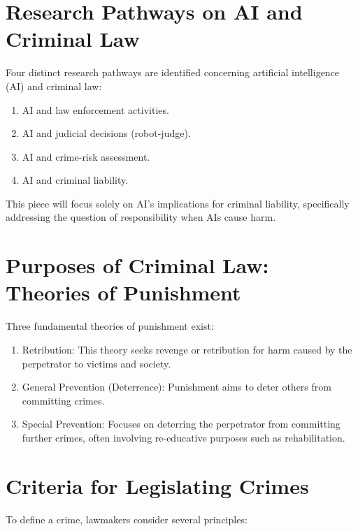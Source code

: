 \section{Research Pathways on AI and Criminal Law}

Four distinct research pathways are identified concerning artificial intelligence (AI) and criminal law:

\begin{enumerate}
    \item AI and law enforcement activities.
    \item AI and judicial decisions (robot-judge).
    \item AI and crime-risk assessment.
    \item AI and criminal liability.
\end{enumerate}

This piece will focus solely on AI's implications for criminal liability, specifically addressing the question of responsibility when AIs cause harm.

\section{Purposes of Criminal Law: Theories of Punishment}

Three fundamental theories of punishment exist:

\begin{enumerate}
    \item Retribution: This theory seeks revenge or retribution for harm caused by the perpetrator to victims and society.
    \item General Prevention (Deterrence): Punishment aims to deter others from committing crimes.
    \item Special Prevention: Focuses on deterring the perpetrator from committing further crimes, often involving re-educative purposes such as rehabilitation.
\end{enumerate}

\section{Criteria for Legislating Crimes}

To define a crime, lawmakers consider several principles:

